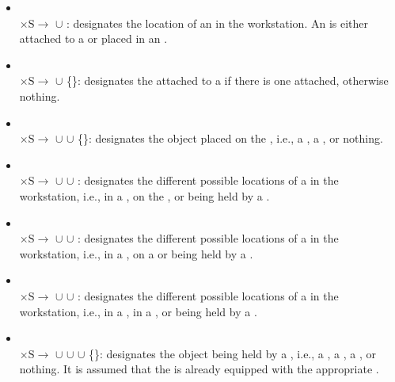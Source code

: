 \begin{itemize}
\item {}\\ $\mathrm{\times S\rightarrow}$ $\cup$ : designates the location of an  in the workstation. An  is either attached to a  or placed in an .

\item {}\\ $\mathrm{\times S\rightarrow}$ $\cup$ \{\}: designates the  attached to a  if there is one attached, otherwise nothing.

\item {}\\ $\mathrm{\times S\rightarrow}$ $\cup$  $\cup$ \{\}: designates the object placed on the , i.e., a , a , or nothing.

\item {}\\ $\mathrm{\times S\rightarrow}$ $\cup$  $\cup$ : designates the different possible locations of a  in the workstation, i.e., in a , on the , or being held by a .

\item {}\\ $\mathrm{\times S\rightarrow}$ $\cup$  $\cup$ : designates the different possible locations of a  in the workstation, i.e., in a , on a  or being held by a .

\item {}\\ $\mathrm{\times S\rightarrow}$ $\cup$  $\cup$ : designates the different possible locations of a  in the workstation, i.e., in a , in a , or being held by a .

\item {}\\ $\mathrm{\times S\rightarrow}$ $\cup$  $\cup$  $\cup$ \{\}: designates the object being held by a , i.e., a , a , a , or nothing. It is assumed that the  is already equipped with the appropriate .


\end{itemize}
